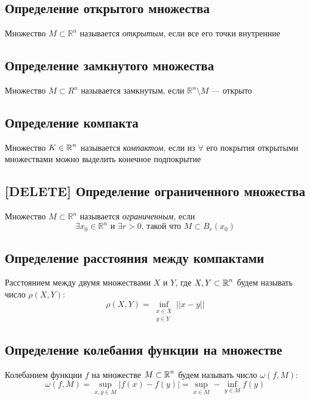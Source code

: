 \documentclass[a4paper]{article}
\begin{document}
\subsection{Определение открытого множества}
 Множество $M\subset\mathbb{R}^n$ называется \textit{открытым}, если все его точки внутренние

\subsection{Определение замкнутого множества}
 Множество $M\subset R^n$ называется замкнутым, если $\mathbb{R}^n\setminus M$ — открыто

\subsection{Определение компакта}
 Множество $K\in\operatorname{\mathbb{R}}^n$ называется \textit{компактом}, если из $\forall$ его покрытия открытыми множествами можно выделить конечное подпокрытие

\subsection{[DELETE] Определение ограниченного множества}
 Множество $M\subset \mathbb{R}^n$ называется \textit{ограниченным}, если $$\exists x_0\in\mathbb{R}^n\text{ и }\exists r>0\text{, такой что }M\subset B_{r}(x_0)$$

\subsection{Определение расстояния между компактами}
 Расстоянием между двумя множествами $X$ и $Y$, где $X, Y \subset \operatorname{\mathbb{R}}^n$ будем называть число $\rho(X, Y)$:
\begin{equation*}
    \rho(X, Y) = \inf_{\substack{x\in X\\y\in{Y}}} ||x-y||
\end{equation*}

\subsection{Определение колебания функции на множестве}
 Колебанием функции $f$ на множестве $M\subset \operatorname{\mathbb{R}}^n$ будем называть число $\omega(f, M)$:
\begin{equation*}
    \omega(f, M) = \sup_{x, y\in M}|f(x) - f(y)| = \sup_{x\in M} - \inf_{y\in M} f(y)
\end{equation*}
\end{document}
